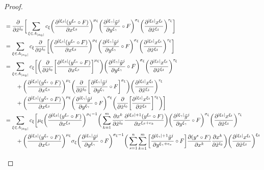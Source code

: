 \documentclass{book}
\begin{document}
\begin{proof}
\begin{enumerate}
\begin{itemize}
\begin{align*}
				& = \frac{\p }{\p \tl{x}^{l_0}} \bigg[ \sum_{\xi \in A_{|\al_0|}} c_{\xi} \bigg( \frac{\p^{|\xi_{\be}|} (y^{\xi_v} \circ F)}{\p x^{\xi_{\be}}} \bigg)^{\mu_{\xi}} \bigg( \frac{\p^{|\xi_{\gam}|} \tl{y}^j}{\p y^{\xi_{\gam}}} \circ F \bigg)^{\sig_{\xi}} \bigg( \frac{\p^{|\xi_{\del}|} x^{\xi_t}}{\p \tl{x}^{\xi_{\del}}} \bigg)^{\tau_{\xi}} \bigg] \\
				& =  \sum_{\xi \in A_{|\al_0|}}  c_{\xi} \frac{\p }{\p \tl{x}^{l_0}} \bigg[ \bigg( \frac{\p^{|\xi_{\be}|} (y^{\xi_v} \circ F)}{\p x^{\xi_{\be}}} \bigg)^{\mu_{\xi}} \bigg( \frac{\p^{|\xi_{\gam}|} \tl{y}^j}{\p y^{\xi_{\gam}}} \circ F \bigg)^{\sig_{\xi}} \bigg( \frac{\p^{|\xi_{\del}|} x^{\xi_t}}{\p \tl{x}^{\xi_{\del}}} \bigg)^{\tau_{\xi}} \bigg] \\
				& =  \sum_{\xi \in A_{|\al_0|}} c_{\xi} \bigg[ \bigg( \frac{\p }{\p \tl{x}^{l_0}} \bigg[ \frac{\p^{|\xi_{\be}|} (y^{\xi_v} \circ F)}{\p x^{\xi_{\be}}} \bigg]^{\mu_{\xi}} \bigg) \bigg( \frac{\p^{|\xi_{\gam}|} \tl{y}^j}{\p y^{\xi_{\gam}}} \circ F \bigg)^{\sig_{\xi}} \bigg( \frac{\p^{|\xi_{\del}|} x^{\xi_t}}{\p \tl{x}^{\xi_{\del}}} \bigg)^{\tau_{\xi}} \\ 
				& \quad \quad + \bigg( \frac{\p^{|\xi_{\be}|} (y^{\xi_v} \circ F)}{\p x^{\xi_{\be}}} \bigg)^{\mu_{\xi}} \bigg( \frac{\p }{\p \tl{x}^{l_0}}  \bigg[ \frac{\p^{|\xi_{\gam}|} \tl{y}^j}{\p y^{\xi_{\gam}}} \circ F \bigg]^{\sig_{\xi}} \bigg) \bigg( \frac{\p^{|\xi_{\del}|} x^{\xi_t}}{\p \tl{x}^{\xi_{\del}}} \bigg)^{\tau_{\xi}} \\
				& \quad \quad + \bigg(\frac{\p^{|\xi_{\be}|} (y^{\xi_v} \circ F)}{\p x^{\xi_{\be}}} \bigg)^{\mu_{\xi}} \bigg( \frac{\p^{|\xi_{\gam}|} \tl{y}^j}{\p y^{\xi_{\gam}}} \circ F \bigg)^{\sig_{\xi}} \bigg( \frac{\p }{\p \tl{x}^{l_0}}  \bigg[ \frac{\p^{|\xi_{\del}|} x^{\xi_t}}{\p \tl{x}^{\xi_{\del}}} \bigg]^{\tau_{\xi}} \bigg) 
				\bigg] \\
				& = \sum_{\xi \in A_{|\al_0|}} c_{\xi} \bigg[ \mu_{\xi} \bigg( \frac{\p^{|\xi_{\be}|} (y^{\xi_v} \circ F)}{\p x^{\xi_{\be}}} \bigg)^{\mu_{\xi}-1} \bigg( \sum_{k=1}^m \frac{\p x^k}{ \p \tl{x}^{l_0}}  \frac{\p^{|\xi_{\be}| + 1} (y^{\xi_v} \circ F)}{\p x^{\xi_{\be} + e_k}} \bigg) \bigg( \frac{\p^{|\xi_{\gam}|} \tl{y}^j}{\p y^{\xi_{\gam}}} \circ F \bigg)^{\sig_{\xi}} \bigg( \frac{\p^{|\xi_{\del}|} x^{\xi_t}}{\p \tl{x}^{\xi_{\del}}} \bigg)^{\tau_{\xi}} \\ 
				& \quad \quad + \bigg( \frac{\p^{|\xi_{\be}|} (y^{\xi_v} \circ F)}{\p x^{\xi_{\be}}} \bigg)^{\mu_{\xi}} \sig_{\xi} \bigg( \frac{\p^{|\xi_{\gam}|} \tl{y}^j}{\p y^{\xi_{\gam}}} \circ F \bigg)^{\sig_{\xi} - 1} \bigg( \sum_{s=1}^n \sum_{k=1}^m \bigg[ \frac{\p^{|\xi_{\gam}| + 1} \tl{y}^j}{\p y^{\xi_{\gam} + e_s}} \circ F \bigg]  \frac{\p (y^s \circ F)}{ \p x^k}  \frac{\p x^k}{\p \tl{x}^{l_0}} \bigg) \bigg( \frac{\p^{|\xi_{\del}|} x^{\xi_t}}{\p \tl{x}^{\xi_{\del}}} \bigg)^{\xi_{\del}} \\

\end{align*}
\end{itemize}
\end{enumerate}
\end{proof}
\end{document}
